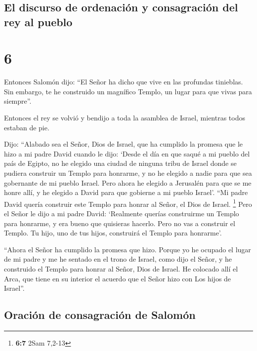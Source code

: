 \hypertarget{el-discurso-de-ordenaciuxf3n-y-consagraciuxf3n-del-rey-al-pueblo}{%
\subsection{El discurso de ordenación y consagración del rey al
pueblo}\label{el-discurso-de-ordenaciuxf3n-y-consagraciuxf3n-del-rey-al-pueblo}}

\hypertarget{section-5}{%
\section{6}\label{section-5}}

 Entonces Salomón dijo: ``El Señor ha dicho que vive en
las profundas tinieblas.  Sin embargo, te he construido un
magnífico Templo, un lugar para que vivas para siempre''.

 Entonces el rey se volvió y bendijo a toda la asamblea de
Israel, mientras todos estaban de pie.

 Dijo: ``Alabado sea el Señor, Dios de Israel, que ha
cumplido la promesa que le hizo a mi padre David cuando le dijo:
 `Desde el día en que saqué a mi pueblo del país de
Egipto, no he elegido una ciudad de ninguna tribu de Israel donde se
pudiera construir un Templo para honrarme, y no he elegido a nadie para
que sea gobernante de mi pueblo Israel.  Pero ahora he
elegido a Jerusalén para que se me honre allí, y he elegido a David para
que gobierne a mi pueblo Israel'.  ``Mi padre David quería
construir este Templo para honrar al Señor, el Dios de Israel.
\footnote{\textbf{6:7} 2Sam 7,2-13}  Pero el Señor le dijo
a mi padre David: `Realmente querías construirme un Templo para
honrarme, y era bueno que quisieras hacerlo.  Pero no vas
a construir el Templo. Tu hijo, uno de tus hijos, construirá el Templo
para honrarme'.

 ``Ahora el Señor ha cumplido la promesa que hizo. Porque
yo he ocupado el lugar de mi padre y me he sentado en el trono de
Israel, como dijo el Señor, y he construido el Templo para honrar al
Señor, Dios de Israel.  He colocado allí el Arca, que
tiene en su interior el acuerdo que el Señor hizo con Los hijos de
Israel''.

\hypertarget{oraciuxf3n-de-consagraciuxf3n-de-salomuxf3n}{%
\subsection{Oración de consagración de
Salomón}\label{oraciuxf3n-de-consagraciuxf3n-de-salomuxf3n}}

